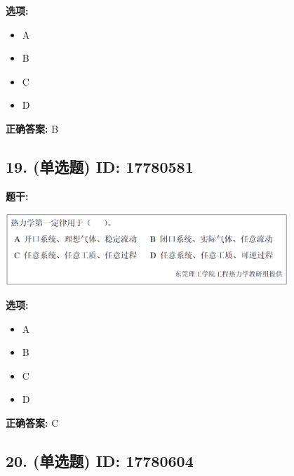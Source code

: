 \documentclass[12pt]{article}
\begin{document}
\textbf{选项:}
\begin{itemize}[leftmargin=*]
  \item A

  \item B

  \item C

  \item D

\end{itemize}

\textbf{正确答案:}
B

\vspace{0.5em}\hrulefill\vspace{1em}

\subsection*{19. (单选题) \small ID: 17780581}

\textbf{题干:}


\begin{center}\includegraphics[width=0.8\textwidth, height=0.25\textheight, keepaspectratio]{question_19_17780581/title_img_1.png}\end{center}

\textbf{选项:}
\begin{itemize}[leftmargin=*]
  \item A

  \item B

  \item C

  \item D

\end{itemize}

\textbf{正确答案:}
C

\vspace{0.5em}\hrulefill\vspace{1em}

\subsection*{20. (单选题) \small ID: 17780604}
\end{document}

